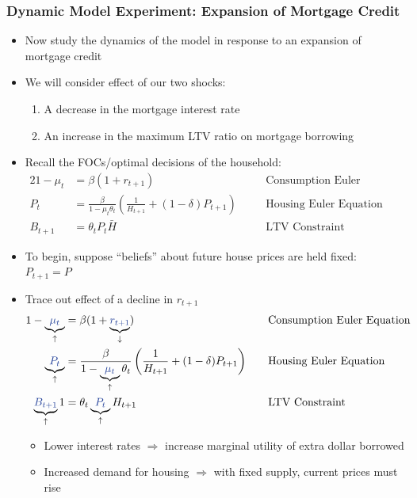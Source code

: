 \documentclass[a4paper,twoside]{article}
\newif\IfInSansMode
\numberwithin{equation}{section}
\numberwithin{figure}{section}
\begin{document}
\subsubsection{Dynamic Model Experiment: Expansion of Mortgage Credit}
	\begin{itemize}
		\item Now study the \textcolor{myblue}{dynamics} of the model in response to an expansion of mortgage credit
		\item We will consider effect of our two shocks:
		\begin{enumerate}[label=\textbf{\arabic*.}]
			\item A decrease in the mortgage interest rate
			\item An increase in the maximum LTV ratio on mortgage borrowing
		\end{enumerate}
		\item Recall the FOCs/optimal decisions of the household:
		\begin{alignat*}{2}
			1-\mu_t&=\beta(1+r_{t+1}) &&\text{Consumption Euler Equation}\\
			P_t&=\frac{\beta}{1-\mu_t\theta_t}\left( \frac{1}{H_{t+1}} + (1-\delta)P_{t+1} \right)\quad &&\text{Housing Euler Equation}\\
			B_{t+1}&=\theta_tP_t\bar{H} &&\text{LTV Constraint}
		\end{alignat*}
		\item To begin, suppose ``beliefs'' about future house prices are held fixed: \( P_{t+1} = P \)
		\item Trace out effect of a decline in \textcolor{myblue}{\( r_{t+1} \)}
		\begin{alignat*}{2}
			1-\underbrace{\textcolor{myblue}{\mu_t}}_\uparrow&=\beta(1+\underbrace{\textcolor{myblue}{r_{t+1}}}_\downarrow) &&\text{Consumption Euler Equation}\\
			\underbrace{\textcolor{myblue}{P_t}}_\uparrow&=\frac{\beta}{1-\underbrace{\textcolor{myblue}{\mu_t}}_\uparrow\theta_t}\left( \frac{1}{H_{t+1}} + (1-\delta)P_{t+1} \right)\quad &&\text{Housing Euler Equation}\\
			\underbrace{\textcolor{myblue}{B_{t+1}}}_\uparrow1&=\theta_t\underbrace{\textcolor{myblue}{P_t}}_\uparrow H_{t+1} &&\text{LTV Constraint}
		\end{alignat*}
		\begin{itemize}
			\item Lower interest rates \( \Rightarrow \) increase marginal utility of extra dollar borrowed
			\item Increased demand for housing \( \Rightarrow \) with fixed supply, current prices must rise

\end{itemize}
\end{itemize}
\end{document}
